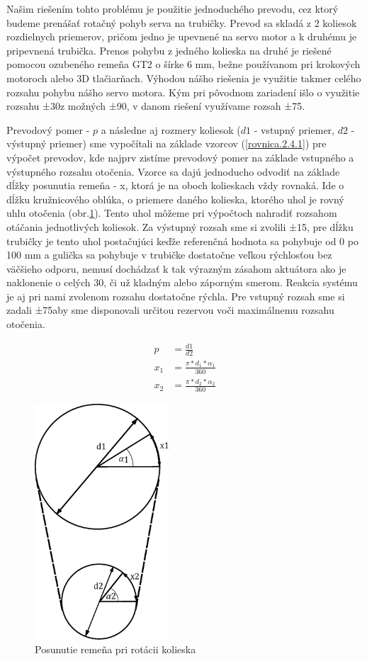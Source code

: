 Našim riešením tohto problému je použitie jednoduchého prevodu, cez ktorý budeme prenášať rotačný pohyb serva na trubičky. Prevod sa skladá z 2 koliesok rozdielnych priemerov, pričom jedno je upevnené na servo motor a k druhému je pripevnená trubička. Prenos pohybu z jedného kolieska na druhé je riešené pomocou ozubeného remeňa GT2 o šírke 6 mm, bežne používanom pri krokových motoroch alebo 3D tlačiarňach. Výhodou nášho riešenia je využitie takmer celého rozsahu pohybu nášho servo motora. Kým pri pôvodnom zariadení išlo o využitie rozsahu ±30\textdegree z možných ±90\textdegree,  v danom riešení využívame rozsah ±75\textdegree.

Prevodový pomer - $p$ a následne aj rozmery koliesok ($d1$ - vstupný priemer, $d2$ - výstupný priemer) sme vypočítali na základe vzorcov (\ref{rovnica.2.4.1}) pre výpočet prevodov, kde najprv zistíme prevodový pomer na základe vstupného a výstupného rozsahu otočenia. Vzorce sa dajú jednoducho odvodiť na základe dĺžky posunutia remeňa - x, ktorá je na oboch kolieskach vždy rovnaká. Ide o dĺžku kružnicového oblúka, o priemere daného kolieska, ktorého uhol je rovný uhlu otočenia (obr.\ref{OBRAZOK 2.4.1}). Tento uhol môžeme pri výpočtoch nahradiť rozsahom otáčania jednotlivých koliesok.  Za výstupný rozsah sme si zvolili ±15\textdegree, pre dĺžku trubičky je tento uhol postačujúci keďže referenčná hodnota sa pohybuje od 0 po 100 mm a gulička sa pohybuje v trubičke dostatočne veľkou rýchlosťou bez väčšieho odporu, nemusí dochádzať k tak výrazným zásahom aktuátora ako je naklonenie o celých 30\textdegree, či už kladným alebo záporným smerom.  Reakcia systému je aj pri nami zvolenom rozsahu dostatočne rýchla. Pre vstupný rozsah sme si zadali ±75\textdegree aby sme disponovali určitou rezervou voči maximálnemu rozsahu otočenia.



\begin{align}
	\label{rovnica.2.4.1}
	p &= \frac{d1}{d2} \\
	x_1&=\frac{\pi*d_1*\alpha_1}{360} \\
	x_2&=\frac{\pi*d_2*\alpha_2}{360}
\end{align}

\begin{figure}[!h]
	\centering
	\includegraphics[width=50mm]{obr/prevod.eps}
	\caption{Posunutie remeňa pri rotácii kolieska}\label{OBRAZOK 2.4.1} 
\end{figure} 

